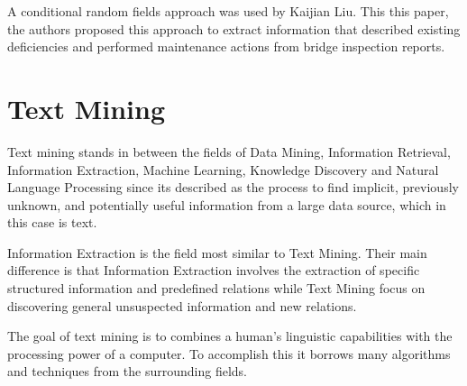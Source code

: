 A conditional random fields approach was used by Kaijian Liu\cite{liu2017ontology}.
This this paper, the authors proposed this approach to extract information that described existing deficiencies and performed maintenance actions from bridge inspection reports.

\section{Text Mining}

Text mining stands in between the fields of Data Mining, Information Retrieval, Information Extraction, Machine Learning, Knowledge Discovery and Natural Language Processing since its described as the process to find implicit, previously unknown, and potentially useful information from a large data source, which in this case is text.

Information Extraction is the field most similar to Text Mining.
Their main difference is that Information Extraction involves the extraction of specific structured information and predefined relations while Text Mining focus on discovering general unsuspected information and new relations\cite{mulins2008information}.

The goal of text mining is to combines a human's linguistic capabilities with the processing power of a computer\cite{fan2006tapping}.
To accomplish this it borrows many algorithms and techniques from the surrounding fields.

